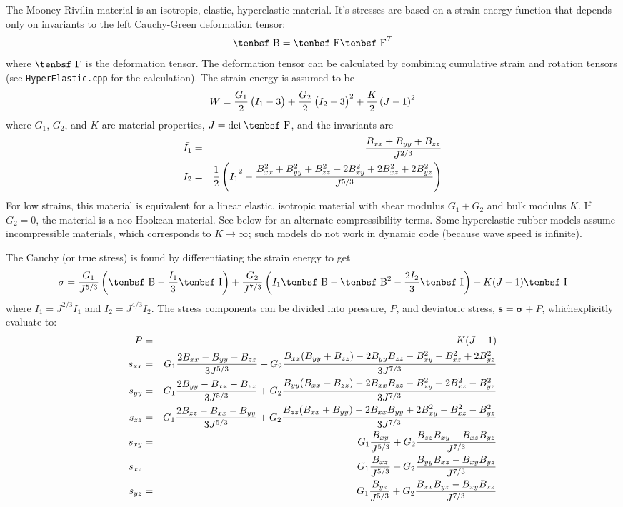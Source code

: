 \documentclass[11pt]{article}
\renewcommand{\vec}[1]{\boldsymbol{#1}}
\def\B{\hbox{\tenbsf B}}
\def\F{\hbox{\tenbsf F}}
\def\I{\hbox{\tenbsf I}}
\begin{document}
The Mooney-Rivilin material is an isotropic, elastic, hyperelastic material. It's stresses are based on a strain energy function that depends only on invariants to the left Cauchy-Green deformation tensor:
\begin{equation}
    \B = \F\F^T
\end{equation}
where $\F$ is the deformation tensor. The deformation tensor can be calculated by combining cumulative strain and rotation tensors (see {\tt HyperElastic.cpp} for the calculation). The strain energy is assumed to be
\begin{equation}
W = {G_1\over2}\left(\bar{I_1}-3\right) + {G_2\over2}\left(\bar{I_2}-3\right)^2 + {K\over2}\left(J-1\right)^2
\end{equation}
where $G_1$, $G_2$, and $K$ are material properties, $J=\det\F$, and the invariants are
\begin{eqnarray}
   \bar{I_1} & = & {B_{xx}+B_{yy}+B_{zz}\over J^{2/3}} \\
   \bar{I_2} & = & {1\over2}\left(\bar{I_1}^2 - {B_{xx}^2+B_{yy}^2+B_{zz}^2+2B_{xy}^2+2B_{xz}^2+2B_{yz}^2\over J^{5/3}}\right)
\end{eqnarray}
For low strains, this material is equivalent for a linear elastic, isotropic material with shear modulus $G_1+G_2$ and bulk modulus $K$. If $G_2=0$, the material is a neo-Hookean material. See below for an alternate compressibility terms. Some hyperelastic rubber models assume incompressible materials, which corresponds to $K\to\infty$; such models do not work in dynamic code (because wave speed is infinite).

The Cauchy (or true stress) is found by differentiating the strain energy to get
\begin{equation}
     \sigma = {G_1\over J^{5/3}}\left(\B - {I_1\over3}\I\right)
                     +  {G_2\over J^{7/3}}\left(I_1\B - \B^2 - {2I_2\over3}\I\right)   + K(J-1)\I
\end{equation}
where $I_1 = J^{2/3}\bar{I_1}$ and $I_2 = J^{4/3}\bar{I_2}$. The stress components can be divided into pressure, $P$, and deviatoric stress, $\vec s = \vec\sigma+P$, whichexplicitly evaluate to:
\begin{eqnarray}
      P & = & -K (J-1) \\
     s_{xx} & = & G_1{2B_{xx}-B_{yy}-B_{zz}\over 3J^{5/3}} + G_2{B_{xx}(B_{yy}+B_{zz})-2B_{yy}B_{zz}-B_{xy}^2-B_{xz}^2+2B_{yz}^2\over 3J^{7/3} }\\
      s_{yy} & = & G_1{2B_{yy}-B_{xx}-B_{zz}\over 3J^{5/3}}    + G_2{B_{yy}(B_{xx}+B_{zz})-2B_{xx}B_{zz}-B_{xy}^2+2B_{xz}^2-B_{yz}^2\over 3J^{7/3} }\\
      s_{zz} & = &  G_1{2B_{zz}-B_{xx}-B_{yy}\over 3J^{5/3}}    + G_2{B_{zz}(B_{xx}+B_{yy})-2B_{xx}B_{yy}+2B_{xy}^2-B_{xz}^2-B_{yz}^2\over 3J^{7/3} }\\
       s_{xy} & = &  G_1{B_{xy}\over J^{5/3}} + G_2{B_{zz}B_{xy}-B_{xz}B_{yz}\over J^{7/3}}\\
       s_{xz} & = & G_1{B_{xz}\over J^{5/3}} + G_2{B_{yy}B_{xz}-B_{xy}B_{yz}\over J^{7/3}}\\
       s_{yz} & = & G_1{B_{yz}\over J^{5/3}} + G_2{B_{xx}B_{yz}-B_{xy}B_{xz}\over J^{7/3}}
\end{eqnarray}
\end{document}
